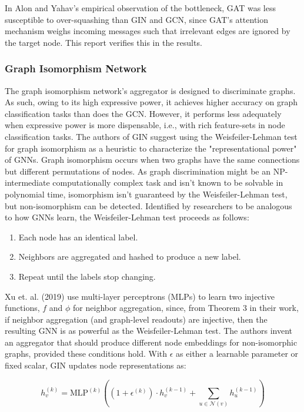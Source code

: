 \documentclass[11pt]{article}
\begin{document}
In Alon and Yahav's empirical observation of the bottleneck, GAT was less susceptible to over-squashing than GIN and GCN, since GAT's attention mechanism weighs incoming messages such that irrelevant edges are ignored by the target node. This report verifies this in the results.

\subsubsection{Graph Isomorphism Network}

The graph isomorphism network's aggregator is designed to discriminate graphs. As such, owing to its high expressive power, it achieves higher accuracy on graph classification tasks than does the GCN. However, it performs less adequately when expressive power is more dispensable, i.e., with rich feature-sets in node classification tasks. The authors of GIN suggest using the Weisfeiler-Lehman test for graph isomorphism \cite{xu2018how} as a heuristic to characterize the "representational power" of GNNs. Graph isomorphism occurs when two graphs have the same connections but different permutations of nodes. As graph discrimination might be an NP-intermediate computationally complex task and isn't known to be solvable in polynomial time, isomorphism isn't guaranteed by the Weisfeiler-Lehman test, but non-isomorphism can be detected. Identified by researchers to be analogous to how GNNs learn, the Weisfeiler-Lehman test proceeds as follows:

\begin{enumerate}
    \item Each node has an identical label.
    \item Neighbors are aggregated and hashed to produce a new label.
    \item Repeat until the labels stop changing.
\end{enumerate}

Xu et. al. (2019) use multi-layer perceptrons (MLPs) to learn two injective functions, $f$ and $\phi$ for neighbor aggregation, since, from Theorem 3 in their work, if neighbor aggregation (and graph-level readouts) are injective, then the resulting GNN is as powerful as the Weisfeiler-Lehman test. The authors invent an aggregator that should produce different node embeddings for non-isomorphic graphs, provided these conditions hold. With $\epsilon$ as either a learnable parameter or fixed scalar, GIN updates node representations as:

\begin{equation}
    h_v^{(k)} = \text{MLP}^{(k)} \left(\left(1 + \epsilon^{(k)}\right) \cdot h_v^{(k - 1)} + \sum_{u \in \mathcal{N}(v)} h_u^{(k - 1)}\right)
\end{equation}
\end{document}
